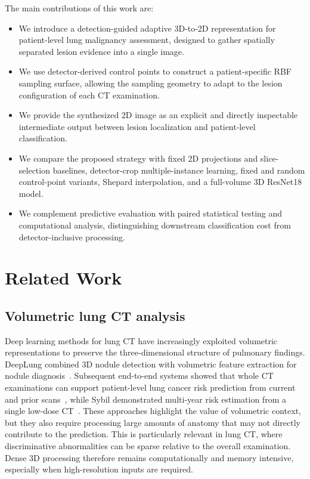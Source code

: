 \documentclass[preprint,12pt]{elsarticle}
\begin{document}
The main contributions of this work are:
\begin{itemize}
\item We introduce a detection-guided adaptive 3D-to-2D representation for patient-level lung malignancy assessment, designed to gather spatially separated lesion evidence into a single image.

\item We use detector-derived control points to construct a patient-specific RBF sampling surface, allowing the sampling geometry to adapt to the lesion configuration of each CT examination.

\item We provide the synthesized 2D image as an explicit and directly inspectable intermediate output between lesion localization and patient-level classification.

\item We compare the proposed strategy with fixed 2D projections and slice-selection baselines, detector-crop multiple-instance learning, fixed and random control-point variants, Shepard interpolation, and a full-volume 3D ResNet18 model.

\item We complement predictive evaluation with paired statistical testing and computational analysis, distinguishing downstream classification cost from detector-inclusive processing.

\end{itemize}


\section{Related Work}

\subsection{Volumetric lung CT analysis}

Deep learning methods for lung CT have increasingly exploited volumetric representations to preserve the three-dimensional structure of pulmonary findings. DeepLung combined 3D nodule detection with volumetric feature extraction for nodule diagnosis~\cite{zhu2018deeplung}. Subsequent end-to-end systems showed that whole CT examinations can support patient-level lung cancer risk prediction from current and prior scans~\cite{ardila2019endtoend}, while Sybil demonstrated multi-year risk estimation from a single low-dose CT~\cite{mikhael2023sybil}. These approaches highlight the value of volumetric context, but they also require processing large amounts of anatomy that may not directly contribute to the prediction. This is particularly relevant in lung CT, where discriminative abnormalities can be sparse relative to the overall examination. Dense 3D processing therefore remains computationally and memory intensive, especially when high-resolution inputs are required.
\end{document}
